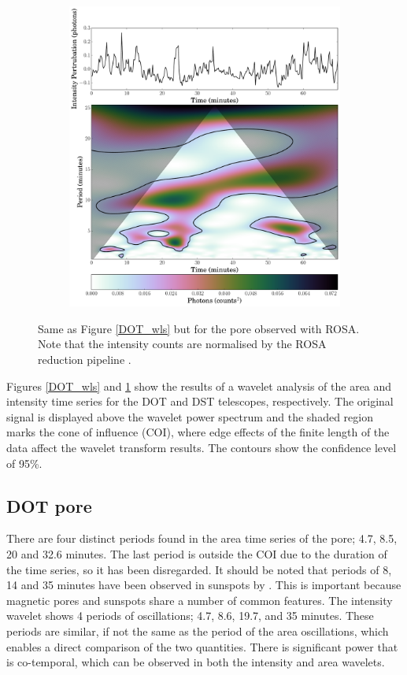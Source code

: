 \begin{figure}
\begin{subfigure}[b]{0.45\textwidth}
            \includegraphics[width=\textwidth]{rosa_inten.pdf}
        \end{subfigure}
        \caption{Same as Figure \ref{DOT_wls} but for the pore observed with ROSA. Note that the intensity counts are normalised by the ROSA reduction pipeline \citep{jess1}.}
        \label{ROSA_wls}
    \end{figure}
    
    Figures \ref{DOT_wls} and \ref{ROSA_wls} show the results of a wavelet analysis of the area and intensity time series for the DOT and DST telescopes, respectively.
    The original signal is displayed above the wavelet power spectrum and the shaded region marks the cone of influence (COI), where edge effects of the finite length of the data affect the wavelet transform results.
    The contours show the confidence level of 95\%. 
    
    \subsection{DOT pore}
    
    There are four distinct periods found in the area time series of the pore; 4.7, 8.5, 20 and 32.6 minutes.
    The last period is outside the COI due to the duration of the time series, so it has been disregarded.
    It should be noted that periods of 8, 14 and 35 minutes have been observed in sunspots by \citet{kobanov}.
    This is important because magnetic pores and sunspots share a number of common features.
    The intensity wavelet shows 4 periods of oscillations; 4.7, 8.6, 19.7, and 35 minutes.
    These periods are similar, if not the same as the period of the area oscillations, which enables a direct comparison of the two quantities. 
    There is significant power that is co-temporal, which can be observed in both the intensity and area wavelets.
    
